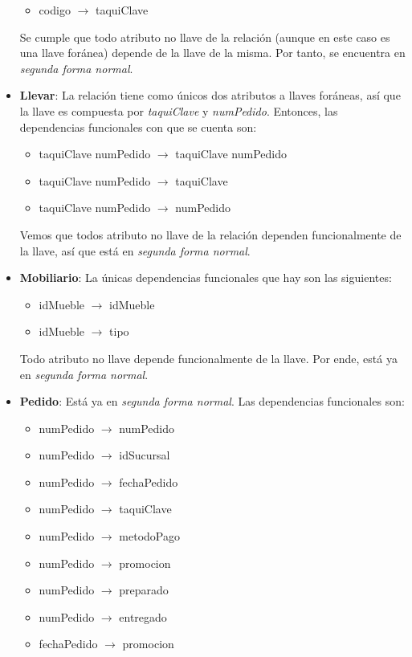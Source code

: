 \documentclass[11pt,letterpaper]{article}
\begin{document}
\begin{itemize}
\begin{itemize}
\item codigo $\rightarrow$ taquiClave
\end{itemize}

Se cumple que todo atributo no llave de la relación (aunque en este caso es una llave foránea) depende de la llave de la misma. Por tanto, se encuentra en \textit{segunda forma normal}. 

\item \textbf{Llevar}: La relación tiene como únicos dos atributos a llaves foráneas, así que la llave es compuesta por \textit{taquiClave} y \textit{numPedido}. Entonces, las dependencias funcionales con que se cuenta son:

\begin{itemize}
\item taquiClave numPedido $\rightarrow$ taquiClave numPedido

\item taquiClave numPedido $\rightarrow$ taquiClave
\item taquiClave numPedido $\rightarrow$ numPedido
\end{itemize}

Vemos que todos atributo no llave de la relación dependen funcionalmente de la llave, así que está en \textit{segunda forma normal}. 
\item \textbf{Mobiliario}: La únicas dependencias funcionales que hay son las siguientes:


\begin{itemize}
\item idMueble $\rightarrow$ idMueble

\item idMueble $\rightarrow$ tipo
\end{itemize}

Todo atributo no llave depende funcionalmente de la llave. Por ende, está ya en \textit{segunda forma normal}.

\item \textbf{Pedido}: Está ya en \textit{segunda forma normal}. Las dependencias funcionales son:

\begin{itemize}
\item numPedido $\rightarrow$ numPedido

\item numPedido $\rightarrow$ idSucursal
\item numPedido $\rightarrow$ fechaPedido
\item numPedido $\rightarrow$ taquiClave
\item numPedido $\rightarrow$ metodoPago
\item numPedido $\rightarrow$ promocion
\item numPedido $\rightarrow$ preparado
\item numPedido $\rightarrow$ entregado
\item fechaPedido $\rightarrow$ promocion
\end{itemize}


\end{itemize}
\end{document}
